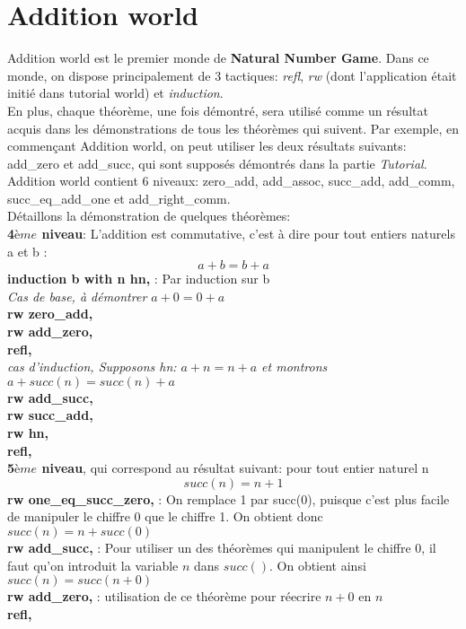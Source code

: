 \documentclass{article}
\begin{document}
\section{Addition world}
Addition world est le premier monde de \textbf{Natural Number Game}. Dans ce monde, on dispose principalement de 3 tactiques: \textit{refl}, \textit{rw} (dont l'application était initié dans tutorial world) et \textit{induction}.\\
En plus, chaque théorème, une fois démontré, sera utilisé comme un résultat acquis dans les démonstrations de tous les théorèmes qui suivent. Par exemple, en commençant Addition world, on peut utiliser les deux résultats suivants: add\_zero et add\_succ, qui sont supposés démontrés dans la partie \textit{Tutorial}.\\
Addition world contient 6 niveaux: zero\_add, add\_assoc, succ\_add, add\_comm, succ\_eq\_add\_one et add_right_comm.\\

Détaillons la démonstration de quelques théorèmes:\\

\textbf{4${ème}$ niveau}: L'addition est commutative, c'est à dire pour tout entiers naturels a et b : $$a+b=b+a$$ 
\textbf{induction b with n hn,} : Par induction sur b \\
\textit{Cas de base, à démontrer $a + 0 = 0 + a$}\\
\textbf{rw zero\_add,}\\
 \textbf{rw add\_zero,}\\
 \textbf{refl,}\\
\textit{cas d'induction, Supposons hn: $a + n = n + a$ et montrons $a + succ (n) = succ (n) + a
$}\\
 \textbf{rw add\_succ,}\\
 \textbf{rw succ\_add,}\\
 \textbf{rw hn,}\\
 \textbf{refl,}\\
 
\textbf{5${ème}$ niveau}, qui correspond au résultat suivant: pour tout entier naturel n  $$succ(n)=n+1$$
\textbf{rw one\_eq\_succ\_zero,} : On remplace 1 par succ(0), puisque c'est plus facile de manipuler le chiffre 0 que le chiffre 1. On obtient donc $succ(n)=n+succ(0)$\\
 \textbf{rw add\_succ,} : Pour utiliser un des théorèmes qui manipulent le chiffre 0, il faut qu'on introduit la variable $n$ dans $succ()$. On obtient ainsi $succ(n)=succ(n+0)$ \\
\textbf{rw add\_zero,} : utilisation de ce théorème pour réecrire $n+0$ en $n$ \\
\textbf{refl,}
\end{document}
